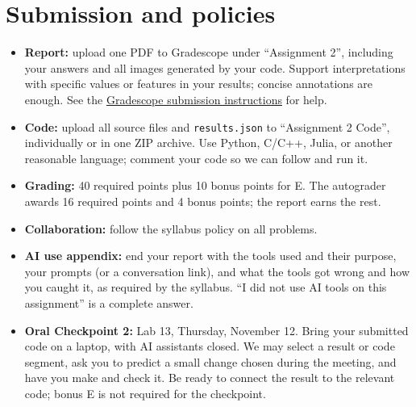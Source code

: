 \newif\ifshowsolutions
\showsolutionsfalse

\usepackage[T1]{fontenc}
\usepackage{booktabs}
\usepackage{needspace}
\setlength{\emergencystretch}{1.5em}
\geometry{top=1.25in,headheight=0.7in,headsep=0.2in}



\pagestyle{fancy}

\section*{Submission and policies}
\begin{itemize}
  \item \textbf{Report:} upload one PDF to Gradescope under ``Assignment 2'', including your answers and all images generated by your code.
        Support interpretations with specific values or features in your results; concise annotations are enough.
        See the \href{https://www.gradescope.com/get_started#student-submission}{Gradescope submission instructions} for help.
  \item \textbf{Code:} upload all source files and \texttt{results.json} to ``Assignment 2 Code'', individually or in one ZIP archive.
        Use Python, C/C++, Julia, or another reasonable language; comment your code so we can follow and run it.
  \item \textbf{Grading:} 40 required points plus 10 bonus points for E.
        The autograder awards 16 required points and 4 bonus points; the report earns the rest.
  \item \textbf{Collaboration:} follow the syllabus policy on all problems.
  \item \textbf{AI use appendix:} end your report with the tools used and their purpose, your prompts (or a conversation link), and what the tools got wrong and how you caught it, as required by the syllabus.
        ``I did not use AI tools on this assignment'' is a complete answer.
  \item \textbf{Oral Checkpoint 2:} Lab 13, Thursday, November 12.
        Bring your submitted code on a laptop, with AI assistants closed.
        We may select a result or code segment, ask you to predict a small change chosen during the meeting, and have you make and check it.
        Be ready to connect the result to the relevant code; bonus E is not required for the checkpoint.
\end{itemize}

